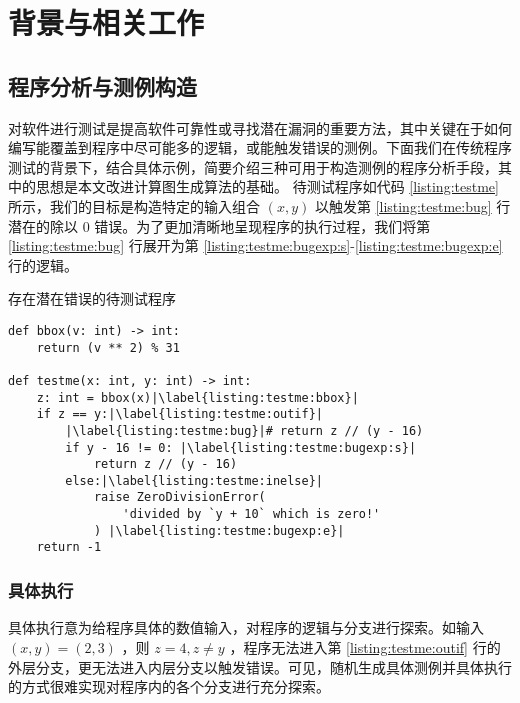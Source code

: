 
\chapter{背景与相关工作}

\section{程序分析与测例构造}

对软件进行测试是提高软件可靠性或寻找潜在漏洞的重要方法，其中关键在于如何编写能覆盖到程序中尽可能多的逻辑，或能触发错误的测例。下面我们在传统程序测试的背景下，结合具体示例，简要介绍三种可用于构造测例的程序分析手段，其中的思想是本文改进计算图生成算法的基础。
待测试程序如代码 \ref{listing:testme} 所示，我们的目标是构造特定的输入组合 $(x, y)$ 以触发第 \ref{listing:testme:bug} 行潜在的除以 0 错误。为了更加清晰地呈现程序的执行过程，我们将第 \ref{listing:testme:bug} 行展开为第 \ref{listing:testme:bugexp:s}-\ref{listing:testme:bugexp:e} 行的逻辑。

\begin{listing}[]
    \caption{存在潜在错误的待测试程序}
    \label{listing:testme}
\begin{verbatim}
def bbox(v: int) -> int:
    return (v ** 2) % 31

def testme(x: int, y: int) -> int:
    z: int = bbox(x)|\label{listing:testme:bbox}|
    if z == y:|\label{listing:testme:outif}|
        |\label{listing:testme:bug}|# return z // (y - 16)
        if y - 16 != 0: |\label{listing:testme:bugexp:s}|
            return z // (y - 16)
        else:|\label{listing:testme:inelse}|
            raise ZeroDivisionError(
                'divided by `y + 10` which is zero!'
            ) |\label{listing:testme:bugexp:e}|
    return -1
\end{verbatim}
\end{listing}

\subsection{具体执行}

具体执行意为给程序具体的数值输入，对程序的逻辑与分支进行探索。如输入 $(x, y) = (2, 3)$ ，则 $z = 4, z \neq y$ ，程序无法进入第 \ref{listing:testme:outif} 行的外层分支，更无法进入内层分支以触发错误。可见，随机生成具体测例并具体执行的方式很难实现对程序内的各个分支进行充分探索。

